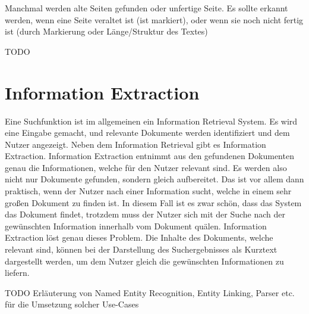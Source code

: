 Manchmal werden alte Seiten gefunden oder unfertige Seite. Es sollte erkannt werden, wenn eine Seite veraltet ist (ist markiert), oder wenn sie noch nicht fertig ist (durch Markierung oder Länge/Struktur des Textes)

TODO

\section{Information Extraction}

Eine Suchfunktion ist im allgemeinen ein Information Retrieval System. Es wird eine Eingabe gemacht, und relevante Dokumente werden identifiziert und dem Nutzer angezeigt. Neben dem Information Retrieval gibt es Information Extraction. Information Extraction entnimmt aus den gefundenen Dokumenten genau die Informationen, welche für den Nutzer relevant sind. Es werden also nicht nur Dokumente gefunden, sondern gleich aufbereitet. Das ist vor allem dann praktisch, wenn der Nutzer nach einer Information sucht, welche in einem sehr großen Dokument zu finden ist. In diesem Fall ist es zwar schön, dass das System das Dokument findet, trotzdem muss der Nutzer sich mit der Suche nach der gewünschten Information innerhalb vom Dokument quälen.
Information Extraction löst genau dieses Problem. Die Inhalte des Dokuments, welche relevant sind, können bei der Darstellung des Suchergebnisses als Kurztext dargestellt werden, um dem Nutzer gleich die gewünschten Informationen zu liefern.

TODO Erläuterung von Named Entity Recognition, Entity Linking, Parser etc. für die Umsetzung solcher Use-Cases